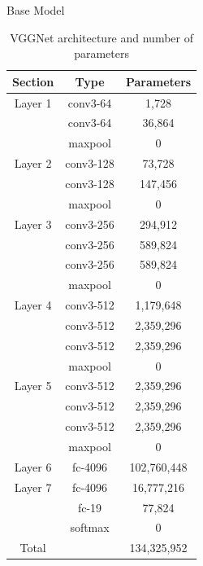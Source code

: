 \documentclass[10pt]{beamer}
\begin{document}
\begin{frame}{Base Model}
\begin{table}
\tiny
\begin{center}
\begin{tabular}{| c | c | c |}
\hline
Section & Type & Parameters\\
\hline\hline
Layer 1 & conv3-64 & 1,728\\
&conv3-64 & 36,864\\
&maxpool & 0\\
Layer 2&conv3-128 & 73,728\\
&conv3-128 & 147,456\\
&maxpool & 0\\
Layer 3&conv3-256 & 294,912\\
&conv3-256 & 589,824\\
&conv3-256 & 589,824\\
&maxpool & 0\\
Layer 4&conv3-512 & 1,179,648\\
&conv3-512 & 2,359,296\\
&conv3-512 & 2,359,296\\
&maxpool & 0\\
Layer 5&conv3-512 & 2,359,296\\
&conv3-512 & 2,359,296\\
&conv3-512 & 2,359,296\\
&maxpool & 0\\
Layer 6&fc-4096 & 102,760,448\\
Layer 7&fc-4096 & 16,777,216\\
&fc-19 & 77,824\\
&softmax & 0\\
\hline
Total & & 134,325,952\\
\hline
\end{tabular}
\end{center}
\caption{VGGNet architecture and number of parameters}
\label{vgg_arch}
\end{table}
\end{frame}
\end{document}
